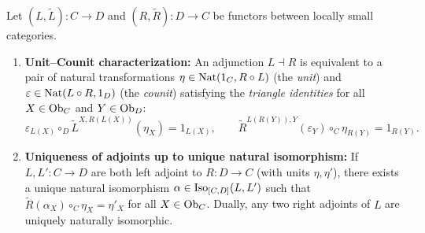 \documentclass[10pt,a4paper]{article}
\begin{document}
\begin{theorem}\label{thm:triangle_id}
Let $(L, \widetilde{L}) : C \to D$ and $(R, \widetilde{R}) : D \to C$ be functors between locally small categories.
\begin{enumerate}
\item \textbf{Unit--Counit characterization:} An adjunction $L \dashv R$ is equivalent to a pair of natural transformations $\eta \in {\textrm{Nat}}(1_C, R \circ L)$ (the \emph{unit}) and $\varepsilon \in {\textrm{Nat}}(L \circ R, 1_D)$ (the \emph{counit}) satisfying the \emph{triangle identities} for all $X \in {\textrm{Ob}}_C$ and $Y \in {\textrm{Ob}}_D$:
$$\varepsilon_{L(X)} \circ_D \widetilde{L}^{X,R(L(X))}(\eta_X) = 1_{L(X)}, \qquad \widetilde{R}^{L(R(Y)),Y}(\varepsilon_Y) \circ_C \eta_{R(Y)} = 1_{R(Y)}.$$
\item \textbf{Uniqueness of adjoints up to unique natural isomorphism:} If $L, L' : C \to D$ are both left adjoint to $R : D \to C$ (with units $\eta, \eta'$), there exists a unique natural isomorphism $\alpha \in {\mathrm{Iso}}_{[C,D]}(L, L')$ such that $\widetilde{R}(\alpha_X) \circ_C \eta_X = \eta'_X$ for all $X \in {\textrm{Ob}}_C$. Dually, any two right adjoints of $L$ are uniquely naturally isomorphic.
\end{enumerate}
\end{theorem}
\myprf
\end{document}

